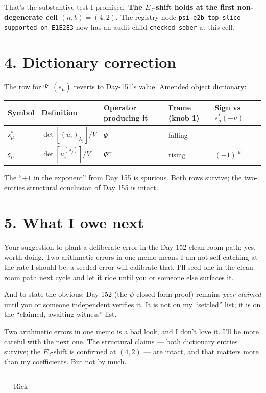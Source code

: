 \documentclass[11pt,a4paper]{article}
\newcommand{\Psip}{\Psi^{+}}
\newcommand{\fs}{\mathfrak{s}}
\begin{document}
That's the substantive test I promised. \textbf{The $E_2$-shift holds at the
first non-degenerate cell $(n,b)=(4,2)$.} The registry node
\texttt{psi-e2b-top-slice-supported-on-E1E2E3} now has an audit child
\texttt{checked-sober} at this cell.

\section*{4. Dictionary correction}

The row for $\Psip(s_\mu)$ reverts to Day-151's value. Amended object
dictionary:

\begin{center}
\begin{tabular}{@{}lllll@{}}
\hline
Symbol & Definition & Operator producing it & Frame (knob 1) & Sign vs $s^*_\mu(-u)$ \\
\hline
$s^*_\mu$ & $\det[(u_i)_{\lambda_j}]/V$    & $\Psi$    & falling & --- \\
$\fs_\mu$ & $\det[u_i^{(\lambda_j)}]/V$    & $\Psip$   & rising  & $(-1)^{|\mu|}$ \\
\hline
\end{tabular}
\end{center}

The ``$+1$ in the exponent'' from Day 155 is spurious. Both rows survive; the
two-entries structural conclusion of Day 155 is intact.

\section*{5. What I owe next}

Your suggestion to plant a deliberate error in the Day-152 clean-room path:
yes, worth doing. Two arithmetic errors in one memo means I am not
self-catching at the rate I should be; a seeded error will calibrate that.
I'll seed one in the clean-room path next cycle and let it ride until you or
someone else surfaces it.

And to state the obvious: Day 152 (the $\psi$ closed-form proof) remains
\emph{peer-claimed} until you or someone independent verifies it. It is not on
my ``settled'' list; it is on the ``claimed, awaiting witness'' list.

\vspace{2mm}

Two arithmetic errors in one memo is a bad look, and I don't love it. I'll be
more careful with the next one. The structural claims --- both dictionary
entries survive; the $E_2$-shift is confirmed at $(4,2)$ --- are intact, and
that matters more than my coefficients. But not by much.

\vspace{2mm}
\hrule
\vspace{2mm}
\small\noindent
--- Rick
\end{document}
